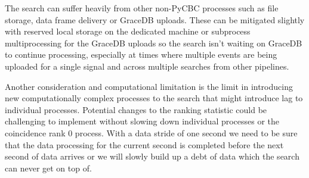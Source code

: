 The search can suffer heavily from other non-PyCBC processes such as file storage, data frame delivery or GraceDB uploads. These can be mitigated slightly with reserved local storage on the dedicated machine or subprocess multiprocessing for the GraceDB uploads so the search isn't waiting on GraceDB to continue processing, especially at times where multiple events are being uploaded for a single signal and across multiple searches from other pipelines.

Another consideration and computational limitation is the limit in introducing new computationally complex processes to the search that might introduce lag to individual processes. Potential changes to the ranking statistic could be challenging to implement without slowing down individual processes or the coincidence rank 0 process. With a data stride of one second we need to be sure that the data processing for the current second is completed before the next second of data arrives or we will slowly build up a debt of data which the search can never get on top of.

